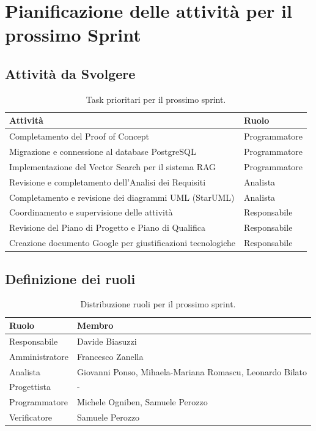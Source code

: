 \documentclass[a4paper, 11pt, oneside]{scrartcl}
\begin{document}
\newpage
\section{Pianificazione delle attività per il prossimo Sprint}

\subsection{Attività da Svolgere}
\begin{table}[h!]
\centering
\begin{tabular}{@{}p{9.2cm}l@{}}
\toprule
\textbf{Attività} & \textbf{Ruolo} \\
\midrule
Completamento del Proof of Concept & Programmatore \\
Migrazione e connessione al database PostgreSQL & Programmatore \\
Implementazione del Vector Search per il sistema RAG & Programmatore \\
Revisione e completamento dell'Analisi dei Requisiti & Analista \\
Completamento e revisione dei diagrammi UML (StarUML) & Analista \\
Coordinamento e supervisione delle attività & Responsabile \\
Revisione del Piano di Progetto e Piano di Qualifica & Responsabile \\
Creazione documento Google per giustificazioni tecnologiche & Responsabile \\
\bottomrule
\end{tabular}
\caption{Task prioritari per il prossimo sprint.}
\end{table}

\subsection{Definizione dei ruoli}
\begin{table}[h!]
\centering
\begin{tabular}{@{}l l@{}}
\toprule
\textbf{Ruolo} & \textbf{Membro} \\
\midrule
Responsabile   & Davide Biasuzzi \\
Amministratore & Francesco Zanella \\
Analista       & Giovanni Ponso, Mihaela-Mariana Romascu, Leonardo Bilato \\
Progettista    & - \\
Programmatore  & Michele Ogniben, Samuele Perozzo \\
Verificatore   & Samuele Perozzo \\
\bottomrule
\end{tabular}
\caption{Distribuzione ruoli per il prossimo sprint.}
\end{table}

\newpage
\end{document}
